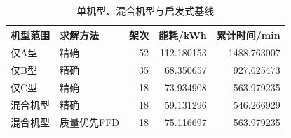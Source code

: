 \begin{table}[htbp]\centering\small
\caption{单机型、混合机型与启发式基线}\label{tab:q1_baselines}
\begin{tabular}{@{}llrrr@{}}
\toprule
机型范围 & 求解方法 & 架次 & 能耗/kWh & 累计时间/min\\
\midrule
仅A型 & 精确 & 52 & 112.180153 & 1488.763007\\
仅B型 & 精确 & 35 & 68.350657 & 927.625473\\
仅C型 & 精确 & 18 & 73.934908 & 563.979235\\
混合机型 & 精确 & 18 & 59.131296 & 546.266929\\
混合机型 & 质量优先FFD & 18 & 75.116697 & 563.979235\\
\bottomrule
\end{tabular}
\end{table}
